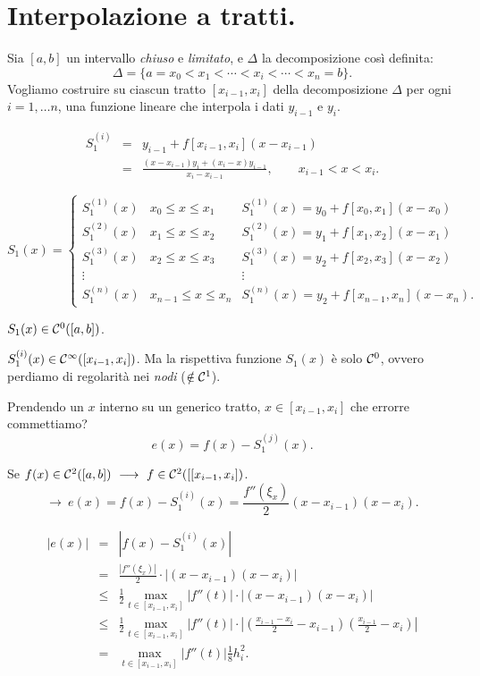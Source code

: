 
\chapter{Interpolazione a tratti.}
Sia $[a,b]$ un intervallo \emph{chiuso} e \emph{limitato}, e $\Delta$
la decomposizione così definita:
\[\Delta = \{a = x_0 < x_1 < \cdots < x_i < \cdots < x_n = b\}.\]
Vogliamo costruire su ciascun tratto $[x_{i-1},x_i]$ della decomposizione 
$\Delta$ per ogni $i = 1, \ldots n$, una funzione lineare che interpola i 
dati $y_{i-1}$ e $y_i$.

\[
\begin{array}{lcl}
S^{(i)}_1 & = & y_{i-1} + f[x_{i-1},x_i](x-x_{i-1}) \\
 & = & \frac{(x-x_{i-1})y_i + (x_i-x)y_{i-1}}{x_i-x_{i-1}}, \qquad x_{i-1} < x 
< x_i. 
\end{array}
\]

\[S_1(x) = \left\{\begin{array}{lcl}
S_1^{(1)}(x) & x_0 \leq x \leq x_1 & S_1^{(1)}(x) = y_0 + f[x_0,x_1](x-x_0) \\
S_1^{(2)}(x) & x_1 \leq x \leq x_2 & S_1^{(2)}(x) = y_1 + f[x_1,x_2](x-x_1) \\
S_1^{(3)}(x) & x_2 \leq x \leq x_3 & S_1^{(3)}(x) = y_2 + f[x_2,x_3](x-x_2) \\
\vdots & & \vdots \\
S_1^{(n)}(x) & x_{n-1} \leq x \leq x_n & S_1^{(n)}(x) = y_2 
+ f[x_{n-1},x_n](x-x_n).
\end{array}\right.
\]

$S_1(x) \in \mathcal{C}^0([a,b])$.

\begin{osse}
$S_1^{(i)}(x) \in \mathcal{C}^{\infty}([x_{i-1},x_i])$. Ma la rispettiva funzione
$S_1(x)$ è solo $\mathcal{C}^0$, ovvero perdiamo di regolarità nei \emph{nodi}
($\notin \mathcal{C}^1$).
\end{osse}

Prendendo un $x$ interno su un generico tratto, $x \in [x_{i-1},x_i]$ che
errorre commettiamo?
\[e(x) = f(x) - S_1^{(j)}(x).\]

Se $f(x) \in \mathcal{C}^2([a,b]) \ \longrightarrow \ f \in \mathcal{C}^2([[x_{i-1},x_i])$.
\[\longrightarrow \ e(x) = f(x) - S_1^{(i)}(x) = \frac{f''(\xi_x)}{2}
(x-x_{i-1})(x-x_i).\]

\[\begin{array}{lcl}\displaystyle
|e(x)| & = & |f(x) - S_1^{(i)}(x)| \\
& = & \frac{|f''(\xi_x)|}{2} \cdot |(x-x_{i-1})(x-x_i)| \\
& \leq & \displaystyle\frac{1}{2}\max_{t \in [x_{i-1},x_i]}|f''(t)| \cdot 
|(x-x_{i-1})(x-x_i)|\\
& \leq & \displaystyle\frac{1}{2}\max_{t \in [x_{i-1},x_i]}|f''(t)|\cdot
\left|\left(\frac{x_{i-1}-x_i}{2} -x_{i-1}\right) \left(
\frac{x_{i-1}}{2}-x_i\right)\right| \\
& = & \displaystyle\max_{t \in [x_{i-1},x_i]}|f''(t)|\frac{1}{8}h_i^2.
\end{array}
\]

